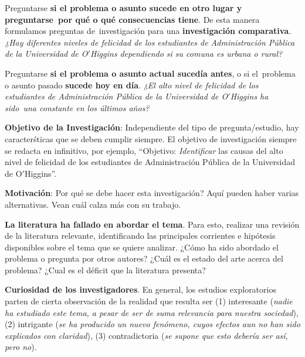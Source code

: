 \documentclass[letterpaper]{article}
\renewenvironment{itemize}{
  \begin{list}{}{
    \setlength{\leftmargin}{1.5em}
  }
}{
  \end{list}
}
\begin{document}
\begin{enumerate}
\begin{itemize}
	\item[-] Preguntarse {\bf si el problema o asunto sucede en otro lugar y preguntarse por qu\'e o qu\'e consecuencias tiene}. De esta manera formulamos preguntas de investigaci\'on para una {\bf investigaci\'on comparativa}. \emph{¿Hay diferentes niveles de felicidad de los estudiantes de Administraci\'on P\'ublica de la Universidad de O$'$Higgins dependiendo si su comuna es urbana o rural?} 
	
	\item[-] Preguntarse {\bf si el problema o asunto actual suced\'ia antes}, o si el problema o asunto pasado {\bf sucede hoy en d\'ia}. \emph{¿El alto nivel de felicidad de los estudiantes de Administraci\'on P\'ublica de la Universidad de O$'$Higgins ha sido una constante en los \'ultimos a\~nos?}
	\end{itemize}


\item {\bf Objetivo de la Investigaci\'on}: Independiente del tipo de pregunta/estudio, hay caracter\'sticas que se deben cumplir siempre. El objetivo de investigaci\'on siempre se redacta en infinitivo, por ejemplo, ``Objetivo: \emph{Identificar} las causas del alto nivel de felicidad de los estudiantes de Administraci\'on P\'ublica de la Universidad de O$'$Higgins''.

\item {\bf Motivaci\'on}: Por qu\'e se debe hacer esta investigaci\'on? Aqu\'i pueden haber varias alternativas. Vean cu\'al calza m\'as con su trabajo.

\begin{itemize}
	\item[-] {\bf La literatura ha fallado en abordar el tema}. Para esto, realizar una revisi\'on de la literatura relevante, identificando las principales corrientes e hip\'otesis disponibles sobre el tema que se quiere analizar. ¿C\'omo ha sido abordado el problema o pregunta por otros autores? ¿Cu\'al es el estado del arte acerca del problema? ¿Cual es el d\'eficit que la literatura presenta?

	\item[-] {\bf Curiosidad de los investigadores}. En general, los estudios exploratorios parten de cierta observaci\'on de la realidad que resulta ser (1) interesante (\emph{nadie ha estudiado este tema, a pesar de ser de suma relevancia para nuestra sociedad}), (2) intrigante (\emph{se ha producido un nuevo fen\'omeno, cuyos efectos aun no han sido explicados con claridad}), (3) contradictoria (\emph{se supone que esto deber\'ia ser as\'i, pero no}).


\end{itemize}
\end{enumerate}
\end{document}
